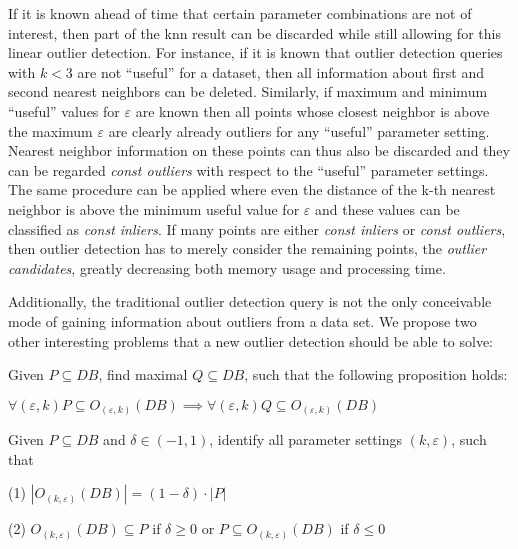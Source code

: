\documentclass[runningheads]{llncs}
\begin{document}
If it is known ahead of time that certain parameter combinations are not of interest, then part of the knn result can be discarded while still allowing for this linear outlier detection. For instance, if it is known that outlier detection queries with $k < 3$ are not ``useful'' for a dataset, then all information about first and second nearest neighbors can be deleted. Similarly, if maximum and minimum ``useful'' values for $\varepsilon$ are known then all points whose closest neighbor is above the maximum $\varepsilon$ are clearly already outliers for any ``useful'' parameter setting. Nearest neighbor information on these points can thus also be discarded and they can be regarded \emph{const outliers} with respect to the ``useful'' parameter settings. The same procedure can be applied where even the distance of the k-th nearest neighbor is above the minimum useful value for $\varepsilon$ and these values can be classified as \emph{const inliers}. If many points are either \emph{const inliers} or \emph{const outliers}, then outlier detection has to merely consider the remaining points, the \emph{outlier candidates}, greatly decreasing both memory usage and processing time.

Additionally, the traditional outlier detection query is not the only conceivable mode of gaining information about outliers from a data set. We propose two other interesting problems that a new outlier detection should be able to solve:

\begin{definition}

\noindent Given $P\subseteq DB$, find maximal $Q\subseteq DB$, such that the following proposition holds:

\noindent $\forall (\varepsilon,k) P \subseteq O_{(\varepsilon, k)}(DB) \implies \forall (\varepsilon,k)Q\subseteq O_{(\varepsilon, k)}(DB)$
\end{definition}

\begin{definition}

\noindent Given $P\subseteq DB$ and $\delta \in (-1,1)$, identify all parameter settings $(k,\varepsilon)$, such that

\noindent(1) $|O_{(k,\varepsilon)}(DB)| = (1 - \delta) \cdot |P|$

\noindent(2) $O_{(k,\varepsilon)}(DB) \subseteq P$ if $\delta \geq 0$ or $P \subseteq O_{(k,\varepsilon)}(DB)$ if $\delta \leq 0$
\end{definition}
\end{document}
